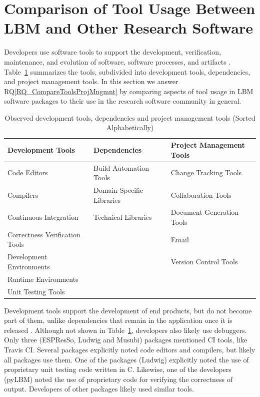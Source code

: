 \documentclass[final, 3p, times, authoryear]{elsarticle}
\newcommand{\rqref}[1]{RQ\ref{#1}}
\begin{document}
\section{Comparison of Tool Usage Between LBM and Other Research Software}
\label{Sec_CompareTools}

Developers use software tools to support the development, verification,
maintenance, and evolution of software, software processes, and artifacts
\citep[p.\ 501]{GhezziEtAl2003}. Table~\ref{tbl_tools} summarizes the tools,
subdivided into development tools, dependencies, and project management tools.
In this section we answer \rqref{RQ_CompareToolsProjMngmnt} by comparing aspects
of tool usage in LBM software packages to their use in the research software
community in general.

\begin{table}[ht!]
	\begin{center}
	\begin{tabular}{ p{5.3 cm} p{4.9 cm} p{5 cm}}
	\toprule
	\textbf{Development Tools} & \textbf{Dependencies} & \textbf{Project
	Management Tools} \\
	\midrule
	Code Editors & Build Automation Tools & Change Tracking Tools\\
	Compilers & Domain Specific Libraries & Collaboration Tools\\
	Continuous Integration & Technical Libraries & Document Generation Tools\\
	Correctness Verification Tools &  & Email\\
	Development Environments &  & Version Control Tools\\
	Runtime Environments &  & \\
	Unit Testing Tools &  & \\
	\bottomrule
	\end{tabular}
	\caption{Observed development tools, dependencies and project management
	tools (Sorted Alphabetically)} \label{tbl_tools}
	\end{center}
\end{table}

Development tools support the development of end products, but do not become
part of them, unlike dependencies that remain in the application once it is
released \citep[p.\ 506]{GhezziEtAl2003}. Although not shown in
Table~\ref{tbl_tools}, developers also likely use debuggers.  Only three
(ESPResSo, Ludwig and Musubi) packages mentioned CI tools, like Travis CI.
Several packages explicitly noted code editors and compilers, but likely all
packages use them. One of the packages (Ludwig) explicitly noted the use of
proprietary unit testing code written in C. Likewise, one of the developers
(pyLBM) noted the use of proprietary code for verifying the correctness of
output. Developers of other packages likely used similar tools.
\end{document}
